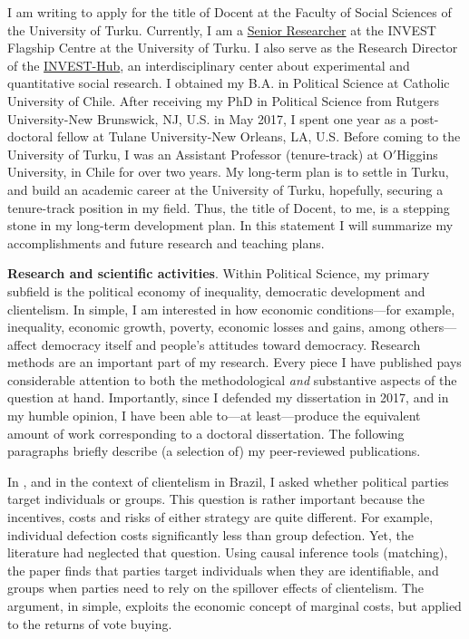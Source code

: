 \documentclass[10pt,stdletter,dateno,sigleft]{newlfm} %
\begin{document}
\begin{newlfm}

\vspace{-0.3cm}I am writing to apply for the title of Docent at the Faculty of Social Sciences of the University of Turku. Currently, I am a \href{https://www.utu.fi/en/people/hector-bahamonde-norambuena}{Senior Researcher} at the INVEST Flagship Centre at the University of Turku. I also serve as the Research Director of the \href{https://www.utu.fi/en/investhub}{INVEST-Hub}, an interdisciplinary center about experimental and quantitative social research. I obtained my B.A. in Political Science at Catholic University of Chile. After receiving my PhD in Political Science from Rutgers University-New Brunswick, NJ, U.S. in May 2017, I spent one year as a post-doctoral fellow at Tulane University-New Orleans, LA, U.S. Before coming to the University of Turku, I was an Assistant Professor (tenure-track) at O$'$Higgins University, in Chile for over two years. My long-term plan is to settle in Turku, and build an academic career at the University of Turku, hopefully, securing a tenure-track position in my field. Thus, the title of Docent, to me, is a stepping stone in my long-term development plan. In this statement I will summarize my accomplishments and future research and teaching plans.

{\bf Research and scientific activities}. Within Political Science, my primary subfield is the political economy of inequality, democratic development and clientelism. In simple, I am interested in how economic conditions---for example, inequality, economic growth, poverty, economic losses and gains, among others---affect democracy itself and people's attitudes toward democracy. Research methods are an important part of my research. Every piece I have published pays considerable attention to both the methodological \emph{and} substantive aspects of the question at hand. Importantly, since I defended my dissertation in 2017, and in my humble opinion, I have been able to---at least---produce the equivalent amount of work corresponding to a doctoral dissertation. The following paragraphs briefly describe (a selection of) my peer-reviewed publications.


In \href{https://doi.org/10.1177/1866802X1801000202}{\textcite{Bahamonde2018}}, and in the context of clientelism in Brazil, I asked whether political parties target individuals or groups. This question is rather important because the incentives, costs and risks of either strategy are quite different. For example, individual defection costs significantly less than group defection. Yet, the literature had neglected that question. Using causal inference tools (matching), the paper finds that parties target individuals when they are identifiable, and groups when parties need to rely on the spillover effects of clientelism. The argument, in simple, exploits the economic concept of marginal costs, but applied to the returns of vote buying. 


\end{newlfm}
\end{document}
